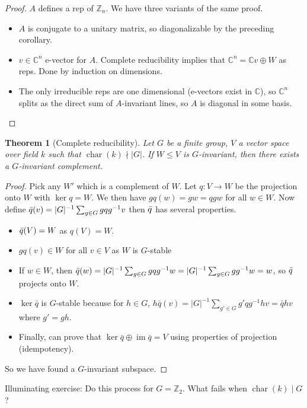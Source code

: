 \documentclass{article}
\theoremstyle{definition}
\theoremstyle{remark}
\theoremstyle{plain}
\newtheorem{thm}[defn]{Theorem}
\newcommand{\ZZ}{\mathbb{Z}}
\newcommand{\CC}{\mathbb{C}}
\begin{document}
\begin{proof}
    $A$ defines a rep of $\ZZ_n$. We have three variants of the same proof.
    \begin{itemize}
        \item $A$ is conjugate to a unitary matrix, so diagonalizable by the preceding corollary.
        \item $v\in\CC^n$ e-vector for $A$. Complete reducibility implies that $\CC^n=\CC v\oplus W$ as reps. Done by induction on dimensions.
        \item The only irreducible reps are one dimensional (e-vectors exist in $\CC$), so $\CC^n$ splits as the direct sum of $A$-invariant lines, so $A$ is diagonal in some basis.
    \end{itemize}
\end{proof}
\begin{thm}[Complete reducibility]
    Let $G$ be a finite group, $V$ a vector space over field $k$ such that $\operatorname{char}(k)\nmid |G|$. If $W\le V$ is $G$-invariant, then there exists a $G$-invariant complement.
\end{thm}
\begin{proof}
    Pick any $W'$ which is a complement of $W$. Let $q:V\to W$ be the projection onto $W$ with $\ker q=W$. We then have $gq(w)=gw=qgw$ for all $w\in W$. Now define $\Bar{q}(v)=|G|^{-1}\sum_{g\in G}gqg^{-1}v$
    then $\Bar{q}$ has several properties.
    \begin{itemize}
        \item $\Bar{q}(V)=W$ as $q(V)=W$.
        \item $gq(v)\in W$ for all $v\in V$ as $W$ is $G$-stable
        \item If $w\in W$, then $\Bar{q}(w)=|G|^{-1}\sum_{g\in G}gqg^{-1}w=|G|^{-1}\sum_{g\in G}gg^{-1}w=w$, so $\Bar{q}$ projects onto $W$.
        \item $\ker\bar{q}$ is $G$-stable because for $h\in G$, $h\bar{q}(v)=|G|^{-1}\sum_{g'\in G}g'qg^{-1}hv=\bar{q}hv$ where $g'=gh$.
        \item Finally, can prove that $\ker\bar q\oplus\operatorname{im}\bar q=V$ using properties of projection (idempotency).
    \end{itemize}
    So we have found a $G$-invariant subspace.
\end{proof}
Illuminating exercise: Do this process for $G=\ZZ_2$.
What fails when $\operatorname{char}(k)\mid G$?
\end{document}
